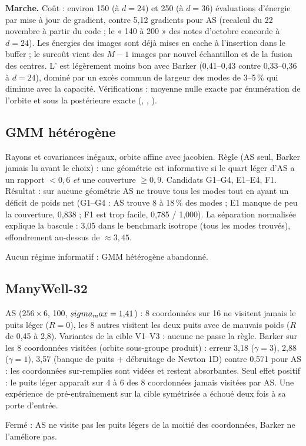 \begin{verdict}
\textbf{Marche.} Coût : environ 150 (à $d=24$) et 250 (à $d=36$) évaluations d'énergie par mise à jour de gradient, contre 5,12 gradients pour AS (recalcul du 22 novembre à partir du code ; le « 140 à 200 » des notes d'octobre concorde à $d=24$). Les énergies des images sont déjà mises en cache à l'insertion dans le buffer ; le surcoût vient des $M-1$ images par nouvel échantillon et de la fusion des centres. L' est légèrement moins bon avec Barker (0,41--0,43 contre 0,33--0,36 à $d=24$), dominé par un excès commun de largeur des modes de 3--5\,\% qui diminue avec la capacité. Vérifications : moyenne nulle exacte par énumération de l'orbite et sous la postérieure exacte (, , ).
\end{verdict}

\subsection{GMM hétérogène}
Rayons et covariances inégaux, orbite affine avec jacobien. Règle (AS seul, Barker jamais lu avant le choix) : une géométrie est informative si le quart léger d'AS a un rapport $<0{,}6$ \emph{et} une couverture $\ge0{,}9$. Candidats G1--G4, E1--E4, F1. Résultat : sur aucune géométrie AS ne trouve tous les modes tout en ayant un déficit de poids net (G1--G4 : AS trouve 8 à 18\,\% des modes ; E1 manque de peu la couverture, 0,838 ; F1 est trop facile, 0,785 / 1,000). La séparation normalisée explique la bascule : 3,05 dans le benchmark isotrope (tous les modes trouvés), effondrement au-dessus de $\approx3{,}45$.
\begin{verdict}Aucun régime informatif : GMM hétérogène abandonné.\end{verdict}

\subsection{ManyWell-32}
AS ($256\times6$,  100, $sigma_max=1{,}41$) : 8 coordonnées sur 16 ne visitent jamais le puits léger ($R=0$), les 8 autres visitent les deux puits avec de mauvais poids ($R$ de 0,45 à 2,8). Variantes de la cible V1--V3 : aucune ne passe la règle. Barker sur les 8 coordonnées visitées (orbite sous-groupe produit) : erreur 3,18 ($\gamma=3$), 2,88 ($\gamma=1$), 3,57 (banque de puits + débruitage de Newton 1D) contre 0,571 pour AS : les coordonnées sur-remplies sont vidées et restent absorbantes. Seul effet positif : le puits léger apparaît sur 4 à 6 des 8 coordonnées jamais visitées par AS. Une expérience de pré-entraînement sur la cible symétrisée a échoué deux fois à sa porte d'entrée.
\begin{verdict}Fermé : AS ne visite pas les puits légers de la moitié des coordonnées, Barker ne l'améliore pas.\end{verdict}

